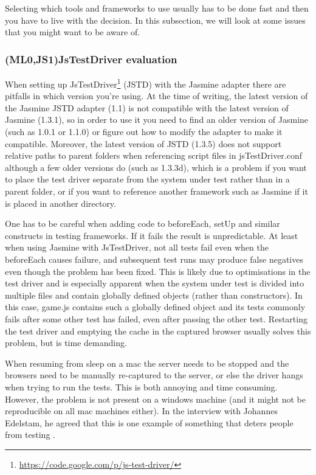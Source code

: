 \documentclass[11pt]{article}
\begin{document}
Selecting which tools and frameworks to use usually has to be done fast and then you have to live with the decision. In this subsection, we will look at some issues that you might want to be aware of.

\subsubsection{(ML0,JS1)JsTestDriver evaluation}
\label{subsec:jstestdriver}

When setting up JsTestDriver\footnote{\url{https://code.google.com/p/js-test-driver/}} (JSTD) with the Jasmine adapter there are pitfalls in which version you're using. At the time of writing, the latest version of the Jasmine JSTD adapter (1.1) is not compatible with the latest version of Jasmine (1.3.1), so in order to use it you need to find an older version of Jasmine (such as 1.0.1 or 1.1.0) or figure out how to modify the adapter to make it compatible. Moreover, the latest version of JSTD (1.3.5) does not support relative paths to parent folders when referencing script files in jsTestDriver.conf although a few older versions do (such as 1.3.3d), which is a problem if you want to place the test driver separate from the system under test rather than in a parent folder, or if you want to reference another framework such as Jasmine if it is placed in another directory.

One has to be careful when adding code to beforeEach, setUp and similar constructs in testing frameworks. If it fails the result is unpredictable. At least when using Jasmine with JsTestDriver, not all tests fail even when the beforeEach causes failure, and subsequent test runs may produce false negatives even though the problem has been fixed. This is likely due to optimisations in the test driver and is especially apparent when the system under test is divided into multiple files and contain globally defined objects (rather than constructors). In this case, game.js contains such a globally defined object and its tests commonly fails after some other test has failed, even after passing the other test. Restarting the test driver and emptying the cache in the captured browser usually solves this problem, but is time demanding.

When resuming from sleep on a mac the server needs to be stopped and the browsers need to be manually re-captured to the server, or else the driver hangs when trying to run the tests. This is both annoying and time consuming. However, the problem is not present on a windows machine (and it might not be reproducible on all mac machines either). In the interview with Johannes Edelstam, he agreed that this is one example of something that deters people from testing \cite{Edelstam}.
\end{document}
